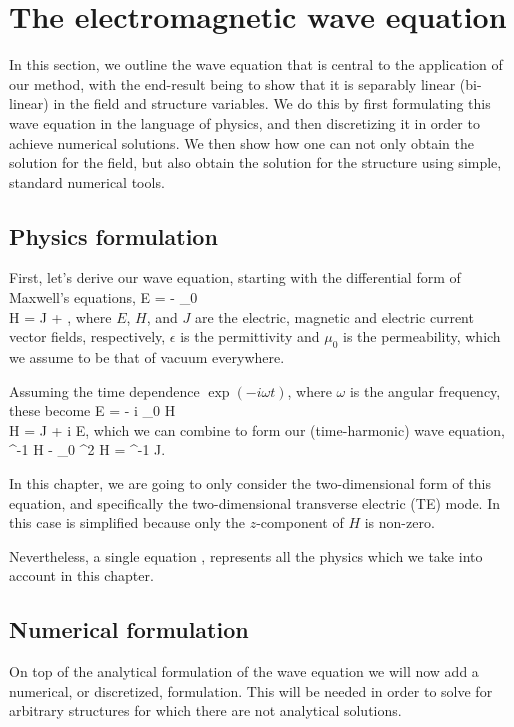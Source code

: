 \section{The electromagnetic wave equation}
In this section, we outline the wave equation
    that is central to the application of our method,
    with the end-result being to show that it is 
    separably linear (bi-linear) in the field and structure variables.
We do this by first formulating this wave equation in the language of physics,
    and then discretizing it in order to achieve numerical solutions.
We then show how one can not only obtain the solution for the field,
    but also obtain the solution for the structure using
    simple, standard numerical tools.

\subsection{Physics formulation}
First, let's derive our wave equation,
    starting with the differential form of Maxwell's equations, 
\BA \curl E = - \mu_0  \\
    \curl H = J + \epsilon {}, \EA
    where $E$, $H$, and $J$ are 
    the electric, magnetic and electric current
    vector fields, respectively,
    $\epsilon$ is the permittivity
    and $\mu_0$ is the permeability, which we assume to be 
    that of vacuum everywhere.


Assuming the time dependence $\exp(-i \omega t)$, 
    where $\omega$ is the angular frequency,
    these become
\BA \curl E = - i \mu_0 \omega H \\
    \curl H = J + i \epsilon \omega E, \label{eq:H2E} \EA
    which we can combine to form our (time-harmonic) wave equation,
\BE \curl \epsilon^{-1} \curl H - \mu_0 \omega^2 H = \curl \epsilon^{-1} J. 
    \label{eq:wave} \EE

In this chapter, we are going to only consider the two-dimensional form
    of this equation, and specifically 
    the two-dimensional transverse electric (TE) mode\cite{taflove}.
In this case  is simplified 
    because only the $z$-component of $H$ is non-zero.

Nevertheless,  a single equation ,
    represents all the physics which we take into account in this chapter.

\subsection{Numerical formulation}
On top of the analytical formulation of the wave equation 
    we will now add a numerical, or discretized, formulation.
This will be needed in order to solve for arbitrary structures
    for which there are not analytical solutions.

